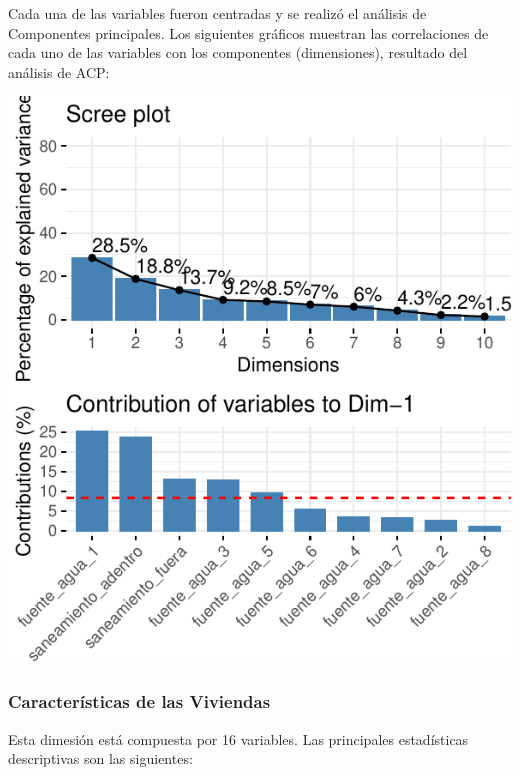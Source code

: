 Cada una de las variables fueron centradas y se realizó el análisis de
Componentes principales. Los siguientes gráficos muestran las
correlaciones de cada uno de las variables con los componentes
(dimensiones), resultado del análisis de ACP:

\includegraphics{Anexo_PCA_files/figure-latex/unnamed-chunk-1-3.pdf}

\hypertarget{caracteruxedsticas-de-las-viviendas}{%
\subsubsection{Características de las
Viviendas}\label{caracteruxedsticas-de-las-viviendas}}

Esta dimesión está compuesta por 16 variables. Las principales
estadísticas descriptivas son las siguientes:

